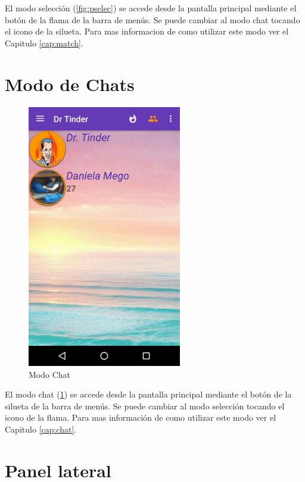 \documentclass[10pt,letterpaper,extrafontsizes]{memoir}
\begin{document}
El modo selección (\ref{fig:pselec}) se accede desde la pantalla principal mediante el botón de la flama de la barra de menús. Se puede cambiar al modo chat tocando el icono de la silueta. Para mas informacion de como utilizar este modo ver el Capitulo \ref{cap:match}.

\section{Modo de Chats} \label{sec:chat}

\begin{figure}[H]
    \centering
\includegraphics[width=0.6\textwidth]{graficos/capturas/q}
    \caption{Modo Chat}
    \label{fig:pchat}
\end{figure}

El modo chat (\ref{fig:pchat}) se accede desde la pantalla principal mediante el botón de la silueta de la barra de menús. Se puede cambiar al modo selección tocando el icono de la flama. Para mas información de como utilizar este modo ver el Capitulo \ref{cap:chat}.

\section{Panel lateral} \label{sec:lat}
\end{document}
